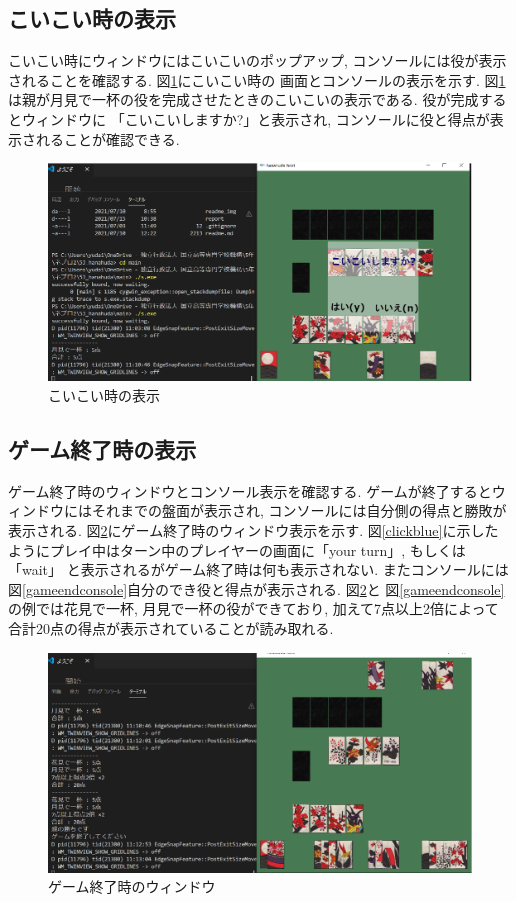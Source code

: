 \documentclass[a4j]{jarticle}
\begin{document}
    \subsection{こいこい時の表示}
    こいこい時にウィンドウにはこいこいのポップアップ, コンソールには役が表示されることを確認する. 図\ref{koikoipopup}にこいこい時の
    画面とコンソールの表示を示す. 図\ref{koikoipopup}は親が月見で一杯の役を完成させたときのこいこいの表示である. 役が完成するとウィンドウに
    「こいこいしますか?」と表示され, コンソールに役と得点が表示されることが確認できる.
    \begin{figure}[H]
    \centering
    \includegraphics[scale=1.0]{./img/koikoi_popup.eps}
    \caption{こいこい時の表示}
    \label{koikoipopup}
    \end{figure}

    \subsection{ゲーム終了時の表示}
    ゲーム終了時のウィンドウとコンソール表示を確認する. ゲームが終了するとウィンドウにはそれまでの盤面が表示され, コンソールには自分側の得点と勝敗が表示される.
    図\ref{gameend}にゲーム終了時のウィンドウ表示を示す. 図\ref{clickblue}に示したようにプレイ中はターン中のプレイヤーの画面に「your turn」, もしくは「wait」
    と表示されるがゲーム終了時は何も表示されない. またコンソールには図\ref{gameendconsole}自分のでき役と得点が表示される. 図\ref{gameend}と
    図\ref{gameendconsole}の例では花見で一杯, 月見で一杯の役ができており, 加えて7点以上2倍によって合計20点の得点が表示されていることが読み取れる.

    \begin{figure}[H]
    \centering
    \includegraphics[scale=1.0]{./img/agari.eps}
    \caption{ゲーム終了時のウィンドウ}
    \label{gameend}
    \end{figure}
\end{document}
